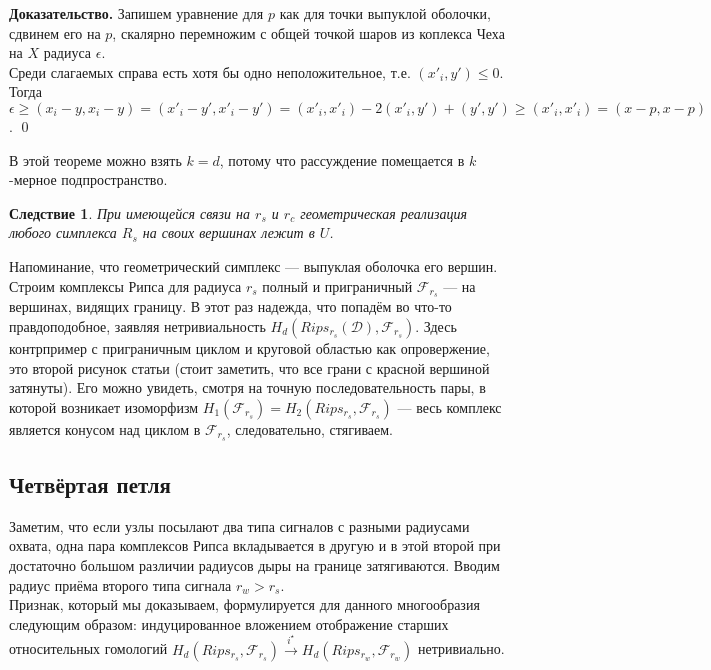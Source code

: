 \documentclass[english,12pt]{article}
\newcounter{stmcounter}[section]
\numberwithin{equation}{section}
\newtheorem{corollary}[stmcounter]{Следствие}
\theoremstyle{definition}
\theoremstyle{remark}
\newenvironment{pf}{\noindent\textbf{Доказательство.}}{\qed}
\renewcommand{\leq}{\leqslant}
\renewcommand{\geq}{\geqslant}
\begin{document}
\begin{pf}
  Запишем уравнение для $p$ как для точки выпуклой оболочки, сдвинем его на $p$, скалярно перемножим с общей точкой шаров из коплекса Чеха на $X$ радиуса $\epsilon$.\\

  Среди слагаемых справа есть хотя бы одно неположительное, т.е. $(x'_i,y') \leq 0$. Тогда $\epsilon \geq (x_i-y,x_i-y) = (x'_i-y',x'_i-y') = (x'_i,x'_i) -2(x'_i,y') + (y',y') \geq (x'_i,x'_i) = (x-p,x-p)$.
\end{pf}

В этой теореме можно взять $k = d$, потому что рассуждение помещается в $k$-мерное подпространство.\\

\begin{corollary}
  При имеющейся связи на $r_s$ и $r_c$ геометрическая реализация любого симплекса $R_s$ на своих вершинах лежит в $U$.
\end{corollary}

Напоминание, что геометрический симплекс --- выпуклая оболочка его вершин.\\

Строим комплексы Рипса для радиуса $r_s$ полный и приграничный $\mathcal{F}_{r_s}$ --- на вершинах, видящих границу. В этот раз надежда, что попадём во что-то правдоподобное, заявляя нетривиальность $H_d(Rips_{r_s}(\mathcal{D}), \mathcal{F}_{r_s})$. Здесь контрпример с приграничным циклом и круговой областью как опровержение, это второй рисунок статьи (стоит заметить, что все грани с красной вершиной затянуты). Его можно увидеть, смотря на точную последовательность пары, в которой возникает изоморфизм $H_1(\mathcal{F}_{r_s}) = H_2(Rips_{r_s},\mathcal{F}_{r_s})$ --- весь комплекс является конусом над циклом в $\mathcal{F}_{r_s}$, следовательно, стягиваем.\\

\subsection{Четвёртая петля}

Заметим, что если узлы посылают два типа сигналов с разными радиусами охвата, одна пара комплексов Рипса вкладывается в другую и в этой второй при достаточно большом различии радиусов дыры на границе затягиваются. Вводим радиус приёма второго типа сигнала $r_w > r_s$.\\

Признак, который мы доказываем, формулируется для данного многообразия следующим образом: индуцированное вложением отображение старших относительных гомологий $H_d(Rips_{r_s},\mathcal{F}_{r_s}) \xrightarrow{i^{\star}} H_d(Rips_{r_w},\mathcal{F}_{r_w})$ нетривиально.\\
\end{document}
